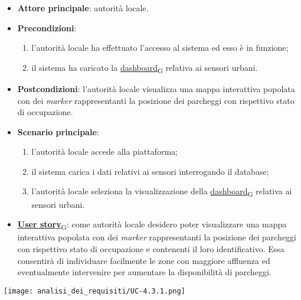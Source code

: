 \begin{itemize}
	\item \textbf{Attore principale}: autorità locale.
	\item \textbf{Precondizioni}:
	      \begin{enumerate}
		      \item l'autorità locale ha effettuato l'accesso al sistema ed esso è in funzione;
		      \item il sistema ha caricato la \href{https://7last.github.io/docs/pb/documentazione-interna/glossario\#dashboard}{dashboard\textsubscript{G}} relativa ai sensori urbani.
	      \end{enumerate}
	\item \textbf{Postcondizioni}: l'autorità locale visualizza una mappa interattiva popolata con dei \textit{marker} rappresentanti la posizione dei parcheggi con rispettivo stato di occupazione.
	\item \textbf{Scenario principale}:
	      \begin{enumerate}
		      \item l'autorità locale accede alla piattaforma;
		      \item il sistema carica i dati relativi ai sensori interrogando il database;
		      \item l'autorità locale seleziona la visualizzazione della \href{https://7last.github.io/docs/pb/documentazione-interna/glossario\#dashboard}{dashboard\textsubscript{G}} relativa ai sensori urbani.
	      \end{enumerate}
	\item \href{https://7last.github.io/docs/pb/documentazione-interna/glossario\#user-story}{\textbf{User story}\textsubscript{G}}:
	      come autorità locale desidero poter visualizzare una mappa interattiva popolata con dei \textit{marker} rappresentanti la posizione dei parcheggi con rispettivo stato di occupazione
	      e contenenti il loro identificativo. Essa consentirà di individuare facilmente le zone con maggiore affluenza ed eventualmente intervenire per aumentare la disponibilità di parcheggi.
\end{itemize}
\begin{center}
	\texttt{[image: analisi\_dei\_requisiti/UC-4.3.1.png]}
\end{center}


